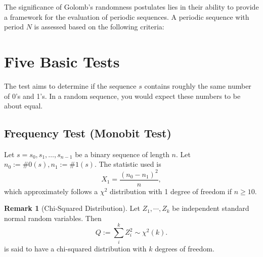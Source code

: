 \documentclass[12pt,openany]{book}
\theoremstyle{definition}
\newtheorem{remark}{Remark}[chapter]
\begin{document}
The significance of Golomb’s randomness postulates lies in their ability to provide a framework for the evaluation of periodic sequences. A periodic sequence with period \( N \) is assessed based on the following criteria:


\newpage
\section{Five Basic Tests}
The test aims to determine if the sequence 
$s$ contains roughly the same number of 0's and 1's. In a random sequence, you would expect these numbers to be about equal.

\subsection{Frequency Test (Monobit Test)}
\begin{tcolorbox}[colback=white,colframe=lemcolor,arc=5pt,title={\color{white}\bf Monobit Test}]
Let \( s = s_0, s_1, \ldots, s_{n-1} \) be a binary sequence of length \( n \).
Let \( n_0:=\#0(s), n_1:=\#1(s) \). The statistic used is
\[ X_1 = \frac{(n_0 - n_1)^2}{n}, \]
which approximately follows a \( \chi^2 \) distribution with 1 degree of freedom if \( n \geq 10 \).
\end{tcolorbox}
\begin{remark}[Chi-Squared Distribution]
	Let $Z_1,\cdots,Z_k$ be independent standard normal random variables. Then \[
	Q:=\sum_{i}^kZ_i^2\sim\chi^2(k).
	\] is said to have a chi-squared distribution with $k$ degrees of freedom.
	\begin{center}
	\end{center}
\end{remark}
\end{document}
